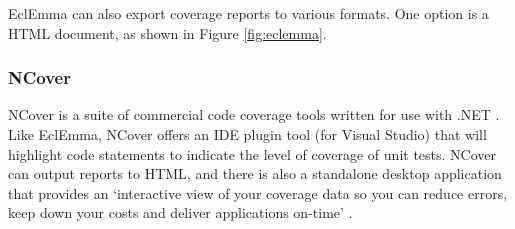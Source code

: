 EclEmma can also export coverage reports to various formats. One option is a HTML document, as shown in Figure \ref{fig:eclemma}.

\subsubsection{NCover}

NCover is a suite of commercial code coverage tools written for use with .NET \citep{NCover}. Like EclEmma, NCover offers an IDE plugin tool (for Visual Studio) that will highlight code statements to indicate the level of coverage of unit tests. NCover can output reports to HTML, and there is also a standalone desktop application that provides an `interactive view of your coverage data so you can reduce errors, keep down your costs and deliver applications on-time' \citep{NCover}. 